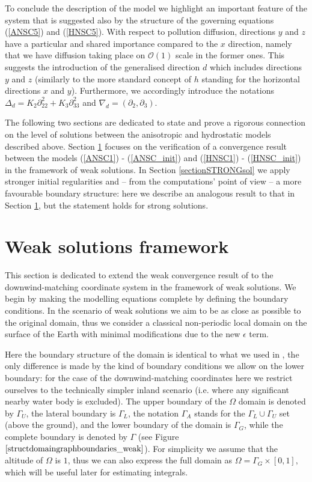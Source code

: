 \documentclass[11pt]{article}
\begin{document}
To conclude the description of the model we highlight an important feature of the system that is suggested also by the structure of the governing equations (\ref{ANSC5}) and (\ref{HNSC5}). With respect to pollution diffusion, directions $y$ and $z$ have a particular and shared importance compared to the $x$ direction, namely that we have diffusion taking place on $\mathcal{O}(1)$ scale in the former ones. This suggests the introduction of the generalised direction $d$ which includes directions $y$ and $z$ (similarly to the more standard concept of $h$ standing for the horizontal directions $x$ and $y$). Furthermore, we accordingly introduce the notations $\Delta_d = K_2 \partial_{22}^2 + K_3 \partial_{33}^2$ and $\nabla_d = (\partial_2, \partial_3).$

The following two sections are dedicated to state and prove a rigorous connection on the level of solutions between the anisotropic and hydrostatic models described above. Section \ref{sectionWS} focuses on the verification of a convergence result between the models (\ref{ANSC1}) - (\ref{ANSC_init}) and (\ref{HNSC1}) - (\ref{HNSC_init}) in the framework of weak solutions. In Section \ref{sectionSTRONGsol} we apply stronger initial regularities and -- from the computations' point of view -- a more favourable boundary structure: here we describe an analogous result to that in Section \ref{sectionWS}, but the statement holds for strong solutions.

\section{Weak solutions framework} \label{sectionWS}

This section is dedicated to extend the weak convergence result of \cite{pollatmws2019} to the downwind-matching coordinate system in the framework of weak solutions. We begin by making the modelling equations complete by defining the boundary conditions. In the scenario of weak solutions we aim to be as close as possible to the original domain, thus we consider a classical non-periodic local domain on the surface of the Earth with minimal modifications due to the new $\epsilon$ term.

Here the boundary structure of the domain is identical to what we used in \cite{pollatmws2019}, the only difference is made by the kind of boundary conditions we allow on the lower boundary: for the case of the downwind-matching coordinates here we restrict ourselves to the technically simpler inland scenario (i.e. where any significant nearby water body is excluded). The upper boundary of the $\Omega$ domain is denoted by $\Gamma_U$, the lateral boundary is $\Gamma_L$, the notation $\Gamma_A$ stands for the $\Gamma_L \cup \Gamma_U$ set (above the ground), and the lower boundary of the domain is $\Gamma_G$, while the complete boundary is denoted by $\Gamma$ (see Figure $\ref{structdomaingraphboundaries_weak}$). For simplicity we assume that the altitude of $\Omega$ is $1$, thus we can also express the full domain as $\Omega = \Gamma_G \times [0,1],$ which will be useful later for estimating integrals.
\end{document}
